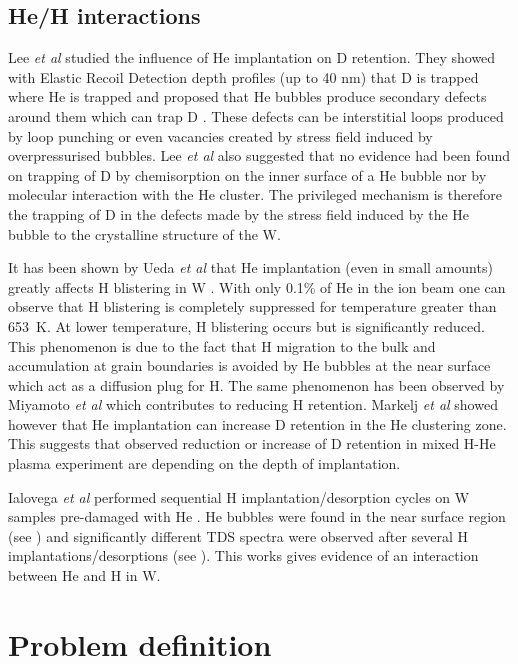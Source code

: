 \subsection{He/H interactions}
Lee \textit{et al} studied the influence of He implantation on D retention.
They showed with Elastic Recoil Detection depth profiles (up to 40 nm) that D is trapped where He is trapped and proposed that He bubbles produce secondary defects around them which can trap D .
These defects can be interstitial loops produced by loop punching or even vacancies created by stress field induced by overpressurised bubbles.
Lee \textit{et al} also suggested that no evidence had been found on trapping of D by chemisorption on the inner surface of a He bubble nor by molecular interaction with the He cluster.
The privileged mechanism is therefore the trapping of D in the defects made by the stress field induced by the He bubble to the crystalline structure of the W.

It has been shown by Ueda \textit{et al} that He implantation (even in small amounts) greatly affects H blistering in W .
With only 0.1\% of He in the ion beam one can observe that H blistering is completely suppressed for temperature greater than \SI{653}{K}.
At lower temperature, H blistering occurs but is significantly reduced.
This phenomenon is due to the fact that H migration to the bulk and accumulation at grain boundaries is avoided by He bubbles at the near surface which act as a diffusion plug for H.
The same phenomenon has been observed by Miyamoto \textit{et al}  which contributes to reducing H retention.
Markelj \textit{et al}  showed however that He implantation can increase D retention in the He clustering zone.
This suggests that observed reduction or increase of D retention in mixed H-He plasma experiment are depending on the depth of implantation.

Ialovega \textit{et al} performed sequential H implantation/desorption cycles on W samples pre-damaged with He .
He bubbles were found in the near surface region (see ) and significantly different TDS spectra were observed after several H implantations/desorptions (see ).
This works gives evidence of an interaction between He and H in W.

\section{Problem definition}

